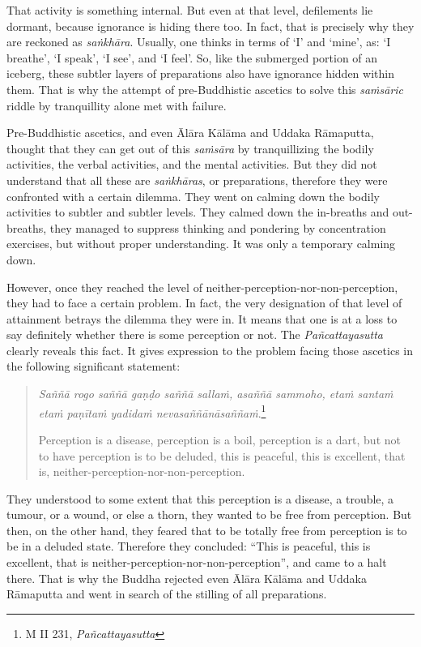 That activity is something internal. But even at that level, defilements lie dormant, because ignorance is hiding there too. In fact, that is precisely why they are reckoned as \emph{saṅkhāra}. Usually, one thinks in terms of `I' and `mine', as: `I breathe', `I speak', `I see', and `I feel'. So, like the submerged portion of an iceberg, these subtler layers of preparations also have ignorance hidden within them. That is why the attempt of pre-Buddhistic ascetics to solve this \emph{saṁsāric} riddle by tranquillity alone met with failure.

Pre-Buddhistic ascetics, and even Ālāra Kālāma and Uddaka Rāmaputta, thought that they can get out of this \emph{saṁsāra} by tranquillizing the bodily activities, the verbal activities, and the mental activities. But they did not understand that all these are \emph{saṅkhāras}, or preparations, therefore they were confronted with a certain dilemma. They went on calming down the bodily activities to subtler and subtler levels. They calmed down the in-breaths and out-breaths, they managed to suppress thinking and pondering by concentration exercises, but without proper understanding. It was only a temporary calming down.

However, once they reached the level of neither-perception-nor-non-perception, they had to face a certain problem. In fact, the very designation of that level of attainment betrays the dilemma they were in. It means that one is at a loss to say definitely whether there is some perception or not. The \emph{Pañcattayasutta} clearly reveals this fact. It gives expression to the problem facing those ascetics in the following significant statement:

\begin{quote}
\emph{Saññā rogo saññā gaṇḍo saññā sallaṁ, asaññā sammoho, etaṁ santaṁ etaṁ paṇītaṁ yadidaṁ nevasaññānāsaññaṁ}.\footnote{M II 231, \emph{Pañcattayasutta}}

Perception is a disease, perception is a boil, perception is a dart, but not to have perception is to be deluded, this is peaceful, this is excellent, that is, neither-perception-nor-non-perception.
\end{quote}

They understood to some extent that this perception is a disease, a trouble, a tumour, or a wound, or else a thorn, they wanted to be free from perception. But then, on the other hand, they feared that to be totally free from perception is to be in a deluded state. Therefore they concluded: ``This is peaceful, this is excellent, that is neither-perception-nor-non-perception'', and came to a halt there. That is why the Buddha rejected even Ālāra Kālāma and Uddaka Rāmaputta and went in search of the stilling of all preparations.

